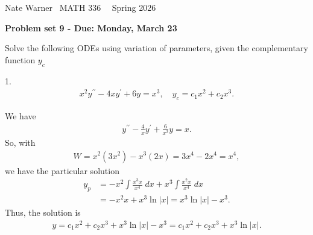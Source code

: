 \documentclass{report}
\title{\Huge{}}
\author{\huge{Nathan Warner}}
\date{\huge{}}
\begin{document}
    \pagebreak \bigbreak \noindent
    Nate Warner \ \quad \quad \quad \quad \quad \quad \quad \quad \quad \quad \quad \quad  MATH 336 \quad  \quad \quad \quad \quad \quad \quad \quad \quad \ \ \quad \quad Spring 2026
    \begin{center}
        \textbf{Problem set 9 - Due: Monday, March 23}
    \end{center}
    \bigbreak \noindent 
    Solve the following ODEs using variation of parameters, given the complementary function $y_{c}$


    \begin{mdframed}
        1. 
        \begin{align*}
            x^{2}y^{\prime\prime} -4xy^{\prime} + 6y = x^{3}, \quad y_{c} = c_{1}x^{2} + c_{2}x^{3}
        .\end{align*}
    \end{mdframed}
    \bigbreak \noindent 
    We have
    \begin{align*}
        y^{\prime\prime} - \frac{4}{x}y^{\prime} + \frac{6}{x^{2}}y = x
    .\end{align*}
    So, with
    \begin{align*}
        W = x^{2}(3x^{2}) - x^{3}(2x) = 3x^{4} - 2x^{4} = x^{4}
    ,\end{align*}
    we have the particular solution
    \begin{align*}
        y_{p} &= -x^{2}\int \frac{x^{3}x}{x^{4}}\; dx + x^{3}\int \frac{x^{2}x}{x^{4}}\; dx \\
              &=-x^{2}x + x^{3}\ln{\left\lvert x \right\rvert} = x^{3}\ln{\left\lvert x \right\rvert} - x^{3}
    .\end{align*}
    Thus, the solution is
    \begin{align*}
        y = c_{1}x^{2} + c_{2}x^{3} + x^{3}\ln{\left\lvert x \right\rvert} - x^{3} = c_{1}x^{2} + c_{2}x^{3} + x^{3}\ln{\left\lvert x \right\rvert}
    .\end{align*}
\end{document}
